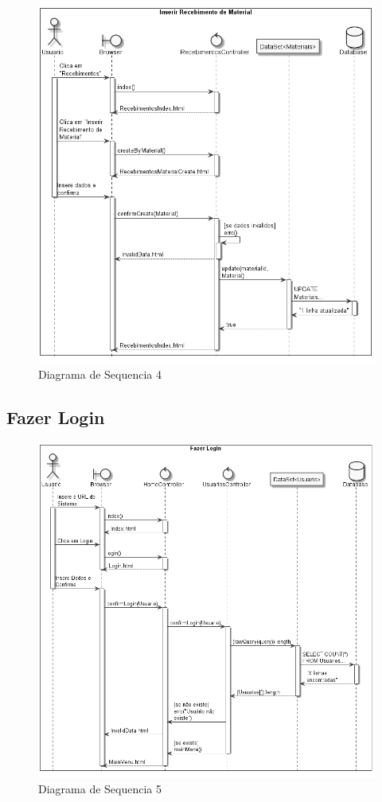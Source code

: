 \documentclass[rascunho,xindy,acronym,symbols]{fei}
\begin{document}
\begin{figure}[H]
    \centering
    \includegraphics[width=\textwidth]{./Images/DS_Inserir_Recebimento_Material.jpg}
    \caption{Diagrama de Sequencia 4}
    \label{fig:diag_seq4}
\end{figure}

\subsection{Fazer Login}

\begin{figure}[H]
    \centering
    \includegraphics[width=\textwidth]{./Images/DS_Fazer_Login.jpg}
    \caption{Diagrama de Sequencia 5}
    \label{fig:diag_seq5}
\end{figure}
\end{document}
